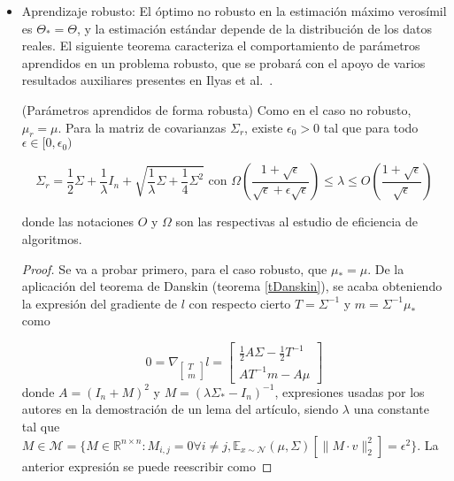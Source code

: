 \begin{itemize}
\begin{proof}
Si se resuelve, se encuentra lo siguiente

$$-2 \cdot \frac{C^2 \cdot \lambda_i}{(C \cdot \lambda_i - 1)^3} = -2 \cdot \frac{C^2 \lambda_j}{(C \cdot \lambda_j - 1)^3}$$

que es cierto, resolviendo en $\mathbb{R}$, si $\lambda_i = \lambda_j$. Entonces, $\Sigma \alpha I_n$. Haciendo las transformaciones necesarias para satisfacer las restricciones, se concluye que $\Sigma=\frac{k}{n} I_n$.
\end{proof}
	\item Aprendizaje robusto: El óptimo no robusto en la estimación máximo verosímil es $\Theta_* = \Theta$, y la estimación estándar depende de la distribución de los datos reales. El siguiente teorema caracteriza el comportamiento de parámetros aprendidos en un problema robusto, que se probará con el apoyo de varios resultados auxiliares presentes en Ilyas et al.~\cite{NoRobustFeatures}.
	
\begin{teorema} (Parámetros aprendidos de forma robusta)
Como en el caso no robusto, $\mu_r = \mu$. Para la matriz de covarianzas $\Sigma_r$, existe $\epsilon_0 > 0$ tal que para todo $\epsilon \in [0,\epsilon_0)$

$$\Sigma_r = \frac{1}{2} \Sigma + \frac{1}{\lambda} I_n + \sqrt{\frac{1}{\lambda} \Sigma + \frac{1}{4} \Sigma^2} \text{ con } \Omega \left( \frac{1+\sqrt{\epsilon}}{\sqrt{\epsilon}+\epsilon \sqrt{\epsilon}} \right) \leq \lambda \leq O \left( \frac{1+\sqrt{\epsilon}}{\sqrt{\epsilon}} \right)$$

donde las notaciones $O$ y $\Omega$ son las respectivas al estudio de eficiencia de algoritmos.
\end{teorema}	

\begin{proof}
Se va a probar primero, para el caso robusto, que $\mu_*=\mu$.
De la aplicación del teorema de Danskin (teorema \ref{tDanskin}), se acaba obteniendo la expresión del gradiente de $l$ con respecto cierto $T=\Sigma^{-1}$ y $m=\Sigma^{-1} \mu_*$ como

$$0 = \nabla_{\begin{bmatrix}
    T \\
    m
\end{bmatrix}} l = \begin{bmatrix}
    \frac{1}{2}A \Sigma - \frac{1}{2} T^{-1} \\
    A T^{-1}m - A \mu
\end{bmatrix}$$
donde $A=(I_n+M)^2$ y $M=(\lambda \Sigma_* - I_n)^{-1}$, expresiones usadas por los autores en la demostración de un lema del artículo, siendo $\lambda$ una constante tal que $M \in \mathcal{M} = \{M \in \mathbb{R}^{n \times n} : M_{i,j}=0 \forall i \neq j, \mathbb{E}_{x \sim \mathcal{N}}(\mu,\Sigma) \left[ \|M \cdot v \|_2^2 \right] = \epsilon^2 \}$.
La anterior expresión se puede reescribir como


\end{proof}
\end{itemize}
